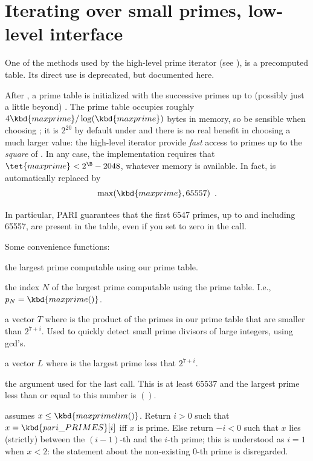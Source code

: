 \section{Iterating over small primes, low-level interface}
\label{se:primetable}

One of the methods used by the high-level prime iterator (see
), is a precomputed table. Its direct use is deprecated,
but documented here.

After , a prime table  is
initialized with the successive primes up to (possibly
just a little beyond) . The prime table occupies roughly
$4 \kbd{maxprime}/\log(\kbd{maxprime})$ bytes in memory, so be sensible when
choosing ; it is $2^{20}$ by default under  and there
is no real benefit in choosing a much larger value: the high-level
iterator provide \emph{fast} access to primes up to the \emph{square}
of . In any case, the implementation requires that
$\tet{maxprime} < 2^{\B} - 2048$, whatever memory is available.
In fact,  is automatically replaced by
$$\max(\kbd{maxprime}, 65557)\enspace.$$

In particular, PARI guarantees that the first 6547 primes, up to and
including 65557, are present in the table, even if you set  to
zero in the  call.

\noindent Some convenience functions:

 the largest prime computable using our prime table.

 the index $N$ of the largest prime computable using
the prime table. I.e., $p_N = \kbd{maxprime()}$.

 a vector $T$ where  is the product of the
primes in our prime table that are smaller than $2^{7+i}$. Used to quickly
detect small prime divisors of large integers, using gcd's.

 a vector $L$ where  is the largest
prime less that $2^{7+i}$.

 the argument used for the last
call. This is at least $65537$ and the largest prime
less than or equal to this number is $()$.

 assumes $x \leq \kbd{maxprimelim()}$. Return
$i > 0$ such that $x = \kbd{pari\_PRIMES}[i]$ iff $x$ is prime. Else
return $-i < 0$ such that $x$ lies (strictly) between the $(i-1)$-th and
the $i$-th prime; this is understood as $i = 1$ when $x < 2$: the statement
about the non-existing $0$-th prime is disregarded.

